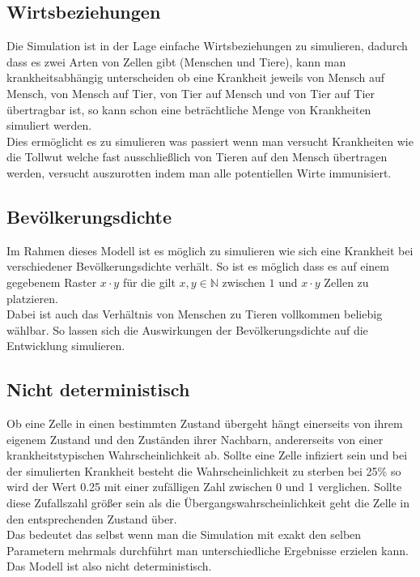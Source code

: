 \subsection*{Wirtsbeziehungen}
Die Simulation ist in der Lage einfache Wirtsbeziehungen zu simulieren, dadurch dass es zwei Arten von Zellen gibt (Menschen und Tiere), kann man krankheitsabhängig unterscheiden ob eine Krankheit jeweils von Mensch auf Mensch, von Mensch auf Tier, von Tier auf Mensch und von Tier auf Tier übertragbar ist, so kann schon eine beträchtliche Menge von Krankheiten simuliert werden.\\
Dies ermöglicht es zu simulieren was passiert wenn man versucht Krankheiten wie die Tollwut welche fast ausschließlich von Tieren auf den Mensch übertragen werden, versucht auszurotten indem man alle potentiellen Wirte immunisiert.

\subsection*{Bevölkerungsdichte}
Im Rahmen dieses Modell ist es möglich zu simulieren wie sich eine Krankheit bei verschiedener Bevölkerungsdichte verhält. So ist es möglich dass es auf einem gegebenem Raster $x\cdot y$ für die gilt $ x,y \in \mathbb{N}$ zwischen $1$ und $x\cdot y$ Zellen zu platzieren.\\
Dabei ist auch das Verhältnis von Menschen zu Tieren vollkommen beliebig wählbar. So lassen sich die Auswirkungen der Bevölkerungsdichte auf die Entwicklung simulieren.

\subsection*{Nicht deterministisch}
Ob eine Zelle in einen bestimmten Zustand übergeht hängt einerseits von ihrem eigenem Zustand und den Zuständen ihrer Nachbarn, andererseits von einer krankheitstypischen Wahrscheinlichkeit ab. Sollte eine Zelle infiziert sein und bei der simulierten Krankheit besteht die Wahrscheinlichkeit zu sterben bei 25\% so wird der Wert 0.25 mit einer zufälligen Zahl zwischen 0 und 1 verglichen. Sollte diese Zufallszahl größer sein als die Übergangswahrscheinlichkeit geht die Zelle in den entsprechenden Zustand über.\\
Das bedeutet das selbst wenn man die Simulation mit exakt den selben Parametern mehrmals durchführt man unterschiedliche Ergebnisse erzielen kann. Das Modell ist also nicht deterministisch.


%
%
%
%
%

